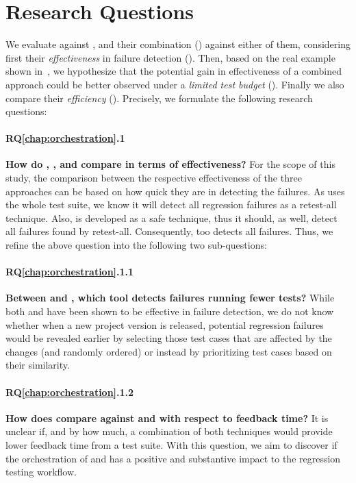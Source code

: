 \section{Research Questions}\label{sec:orch_rqs}

We evaluate \ek against \fs, and their combination (\fz) against either of them, considering first  their \textit{effectiveness} in  failure detection  (). Then, based on the real example shown in~, we hypothesize that the potential gain in effectiveness of a combined approach could be better observed under a \textit{limited test budget} (). Finally we also compare their \textit{efficiency} (). Precisely,  we formulate the following research questions:

\paragraph{RQ\ref{chap:orchestration}.1}\label{rq:orch1} \textbf{How do \ek, \fs, and \fz compare in terms of effectiveness?}
For the scope of this study, the comparison between the respective effectiveness of the three approaches can be based on how quick they are in detecting the failures.  As \fs uses the whole test suite, we know it will detect all regression failures as a retest-all technique.
Also, \ek is developed as a safe \tcs technique, thus it should, as well, detect all failures found by retest-all.
Consequently, \fz too detects all failures.
Thus, we refine the above question into the following two sub-questions:

\paragraph{RQ\ref{chap:orchestration}.1.1}\label{rq:orch1.1} \textbf{Between \ek and \fs, which tool detects failures running fewer tests?}
While both \ek and \fs have been shown to be effective in failure  detection,  we do not  know whether when a new project version is released, potential regression failures would be revealed earlier by selecting those test cases that are affected by the changes (and randomly ordered) or instead by prioritizing test cases based on their similarity. 

\paragraph{RQ\ref{chap:orchestration}.1.2}\label{rq:orch1.2} \textbf{How does \fz compare against \ek and \fs with respect to feedback time?} 
It is unclear if, and by how much, a combination of both techniques would provide lower feedback time from a test suite.
With this question, we aim to discover if the orchestration of \tcs and \tcp has a positive and substantive impact to the regression testing workflow.


